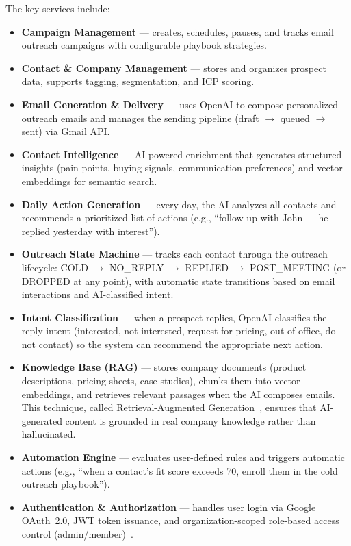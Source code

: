 \documentclass[a4paper]{article}
\begin{document}
The key services include:

\begin{itemize}
    \item \textbf{Campaign Management} --- creates, schedules, 
    pauses, and tracks email outreach campaigns with configurable 
    playbook strategies.
    \item \textbf{Contact \& Company Management} --- stores and 
    organizes prospect data, supports tagging, segmentation, and 
    ICP scoring.
    \item \textbf{Email Generation \& Delivery} --- uses OpenAI to 
    compose personalized outreach emails and manages the sending 
    pipeline (draft $\rightarrow$ queued $\rightarrow$ sent) via 
    Gmail API.
    \item \textbf{Contact Intelligence} --- AI-powered enrichment 
    that generates structured insights (pain points, buying signals, 
    communication preferences) and vector embeddings for semantic 
    search.
    \item \textbf{Daily Action Generation} --- every day, the AI 
    analyzes all contacts and recommends a prioritized list of 
    actions (e.g., ``follow up with John --- he replied yesterday 
    with interest'').
    \item \textbf{Outreach State Machine} --- tracks each contact 
    through the outreach lifecycle: COLD $\rightarrow$ NO\_REPLY 
    $\rightarrow$ REPLIED $\rightarrow$ POST\_MEETING (or DROPPED at any point), with 
    automatic state transitions based on email interactions and 
    AI-classified intent.
    \item \textbf{Intent Classification} --- when a prospect 
    replies, OpenAI classifies the reply intent (interested, not 
    interested, request for pricing, out of office, do not contact) 
    so the system can recommend the appropriate next action.
    \item \textbf{Knowledge Base (RAG)} --- stores company documents 
    (product descriptions, pricing sheets, case studies), chunks 
    them into vector embeddings, and retrieves relevant passages 
    when the AI composes emails. This technique, called 
    Retrieval-Augmented 
    Generation~\cite{bechard2024reducing}, ensures 
    that AI-generated content is grounded in real company knowledge 
    rather than hallucinated.
    \item \textbf{Automation Engine} --- evaluates user-defined 
    rules and triggers automatic actions (e.g., ``when a contact's 
    fit score exceeds 70, enroll them in the cold outreach 
    playbook'').
    \item \textbf{Authentication \& Authorization} --- handles user 
    login via Google OAuth~2.0, JWT token issuance, and 
    organization-scoped role-based access control 
    (admin/member)~\cite{rfc7519}.
\end{itemize}
\end{document}

